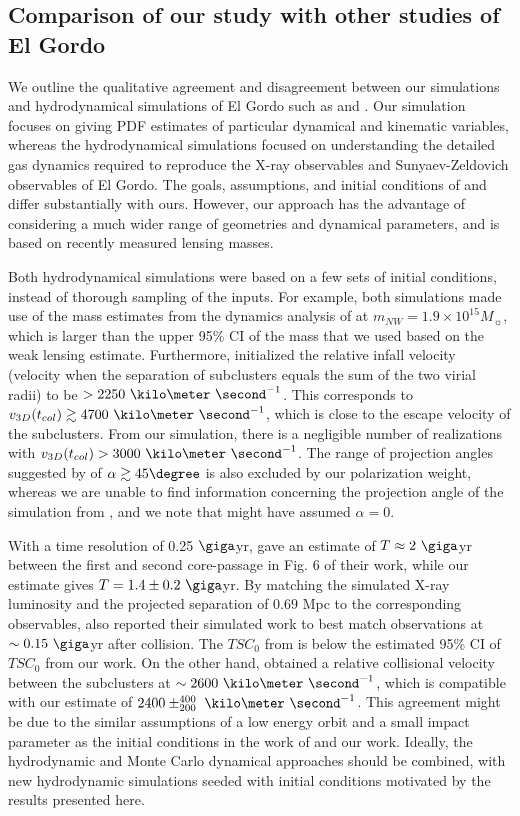 \subsection{Comparison of our study with other studies of El Gordo}
We outline the qualitative agreement and disagreement between our
simulations and hydrodynamical simulations of El Gordo such as
\cite{Donnert13} and \cite{Molnar14}. Our simulation focuses on giving PDF
estimates of particular dynamical and kinematic variables, whereas the
hydrodynamical simulations focused on understanding the detailed gas dynamics
required to reproduce the X-ray observables and Sunyaev-Zeldovich
observables of El Gordo. The goals,
assumptions, and initial conditions of \cite{Donnert13} and \cite{Molnar14}
differ substantially with ours. However, our approach has the advantage of considering a much wider range of geometries and dynamical parameters, and is based on recently measured lensing masses.
\par 
Both hydrodynamical simulations were based on a few sets of initial
conditions, instead of thorough sampling of the inputs. For example, both
simulations made use of the mass estimates from the dynamics analysis
of  at $m_{NW} = 1.9 \times
10^{15} M_{\sun}$,
which is larger than the upper 95\% CI of the mass that we used based on
the weak lensing estimate.
Furthermore, \cite{Molnar14} initialized the relative infall velocity
(velocity when the separation of subclusters equals the sum of the two virial
radii) to be $> 2250~\kilo \meter~ \second^{-1}$. This corresponds to
$v_{3D}(t_{col}) \gtrsim 4700~\kilo \meter~\second^{-1}$, which is close to
the escape velocity of the subclusters. From our simulation, there is a
negligible number of realizations with $v_{3D}(t_{col}) >
3000~\kilo\meter~\second^{-1}$. The range of projection angles suggested by
\cite{Molnar14} of $\alpha \gtrsim 45\degree$ is also excluded by our
polarization weight, whereas we are unable to find information concerning
the projection angle of the simulation from \cite{Donnert13}, and we note
that \cite{Donnert13}
might have assumed $\alpha = 0$. \par 
With a time resolution of 0.25 $\giga$yr,
\cite{Donnert13} gave an estimate of  $T\approx 2~\giga$yr between the
first and second core-passage in Fig. 6 of their work, while our estimate gives $T
= 1.4\pm {0.2}~\giga$yr. 
By matching the simulated X-ray luminosity and the projected separation
of $0.69$ Mpc to the corresponding observables, \cite{Donnert13} also reported their simulated work 
to best match  observations at $\sim 0.15~\giga$yr after collision. 
The $TSC_0$ from \cite{Donnert13} is below the estimated 95\% CI of
$TSC_0$ from our work.
On the other hand, \cite{Donnert13} obtained a
relative collisional velocity between the subclusters at $\sim
2600~\kilo\meter~\second^{-1}$, which is compatible with our estimate of
$2400\pm^{400}_{200}~\kilo\meter~\second^{-1}$.  
This agreement might be due to the similar assumptions of a low
energy orbit and a small impact parameter as the initial conditions in the
work of \cite{Donnert13} and our work. 
Ideally, the hydrodynamic and Monte Carlo dynamical approaches should be combined, with new hydrodynamic simulations seeded with initial conditions motivated by the results presented here.



